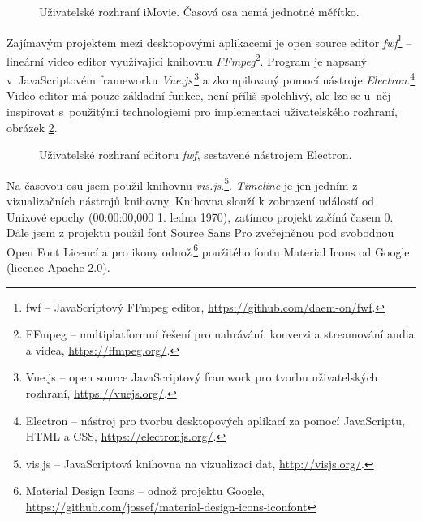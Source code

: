\begin{figure}[h]
	\centering
	\caption{Uživatelské rozhraní iMovie. Časová osa nemá jednotné měřítko.}\label{img:imovie}
\end{figure}

Zajímavým projektem mezi desktopovými aplikacemi je open source editor \textit{fwf}\footnote{fwf -- JavaScriptový FFmpeg editor, \url{https://github.com/daem-on/fwf}.} -- lineární video editor využívající knihovnu \textit{FFmpeg}\footnote{FFmpeg -- multiplatformní řešení pro nahrávání, konverzi a streamování audia a videa, \url{https://ffmpeg.org/}.}. Program je napsaný v~JavaScriptovém frameworku \textit{Vue.js}\,\footnote{Vue.js -- open source JavaScriptový framwork pro tvorbu uživatelských rozhraní, \url{https://vuejs.org/}.} a zkompilovaný pomocí nástroje \textit{Electron}.\footnote{Electron -- nástroj pro tvorbu desktopových aplikací za pomocí JavaScriptu, HTML a CSS, \url{https://electronjs.org/}.} Video editor má pouze základní funkce, není příliš spolehlivý, ale lze se u~něj inspirovat s~použitými technologiemi pro implementaci uživatelského rozhraní, obrázek \ref{img:fwf}.
\begin{figure}[h]
	\centering
	\caption{Uživatelské rozhraní editoru \textit{fwf}, sestavené nástrojem Electron.}\label{img:fwf}
\end{figure}
Na časovou osu jsem použil knihovnu \textit{vis.js}.\footnote{vis.js -- JavaScriptová knihovna na vizualizaci dat, \url{http://visjs.org/}.}. \textit{Timeline} je jen jedním z vizualizačních nástrojů knihovny. Knihovna slouží k zobrazení událostí od Unixové epochy (00:00:00,000 1. ledna 1970), zatímco projekt začíná časem 0. Dále jsem z projektu použil font Source Sans Pro zveřejněnou pod svobodnou Open Font Licencí a pro ikony odnož\,\footnote{Material Design Icons -- odnož projektu Google, \url{https://github.com/jossef/material-design-icons-iconfont}} použitého fontu Material Icons od Google (licence Apache-2.0).

